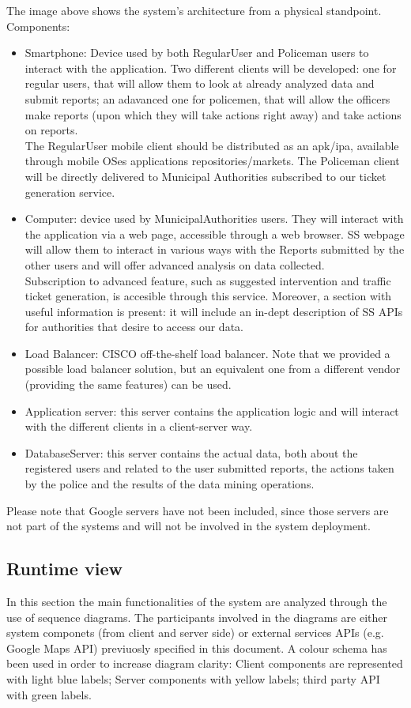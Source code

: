 The image above shows the system's architecture from a physical standpoint.
Components:
\begin{itemize}
\item Smartphone: Device used by both RegularUser and Policeman users to interact with the application. Two different clients will be developed: one for regular users, that will allow them to look at already analyzed data and submit reports; an adavanced one for policemen, that will allow the officers make reports (upon which they will take actions right away) and take actions on reports.\\
The RegularUser mobile client should be distributed as an apk/ipa, available through mobile OSes applications repositories/markets. The Policeman client will be directly delivered to Municipal Authorities subscribed to our ticket generation service.

\item Computer: device used by MunicipalAuthorities users. They will interact with the application via a web page, accessible through a web browser. SS webpage will allow them to interact in various ways with the Reports submitted by the other users and will offer advanced analysis on data collected. \\
Subscription to advanced feature, such as suggested intervention and traffic ticket generation, is accesible through this service. Moreover, a section with useful information is present: it will include an in-dept description of SS APIs for authorities that desire to access our data.
\item Load Balancer: CISCO off-the-shelf load balancer. Note that we provided a possible load balancer solution, but an equivalent one from a different vendor (providing the same features) can be used. 
\item Application server: this server contains the application logic and will interact with the different clients in a client-server way.
\item DatabaseServer: this server contains the actual data, both about the registered users and related to the user submitted reports, the actions taken by the police and the results of the data mining operations.
\end{itemize}
Please note that Google servers have not been included, since those servers are not part of the systems and will not be involved in the system deployment.
\newpage

\subsection{Runtime view}
In this section the main functionalities of the system are analyzed through the use of sequence diagrams. The participants involved in the diagrams are either system componets (from client and server side) or external services APIs (e.g. Google Maps API) previuosly specified in this document.\newline
A colour schema has been used in order to increase diagram clarity: Client components are represented with light blue labels; Server components with yellow labels; third party API with green labels.


